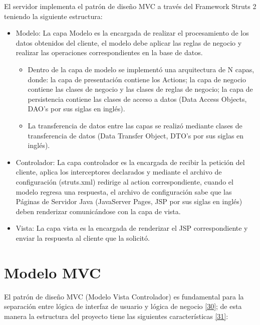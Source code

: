 El servidor implementa el patrón de diseño MVC a través del Framework Struts 2 teniendo la siguiente estructura:
\begin{itemize}
	\item Modelo: La capa Modelo es la encargada de realizar el procesamiento de los datos obtenidos del cliente, el modelo debe aplicar las reglas de negocio y realizar las operaciones correspondientes en la base de datos.
	
	\begin{itemize}
	
	\item Dentro de la capa de modelo se implementó una arquitectura de N capas, donde: la capa de presentación contiene los Actions; la capa de negocio contiene las clases de negocio y las clases de reglas de negocio; la capa de persistencia contiene las clases de acceso a datos (Data Access Objects, DAO’s por sus siglas en inglés).\\
	
	\item La transferencia de datos entre las capas se realizó mediante clases de transferencia de datos (Data Transfer Object,  DTO’s por sus siglas en inglés).
	
	\end{itemize}
	
	\item Controlador: La capa controlador es la encargada de recibir la petición del cliente, aplica los interceptores declarados y mediante el archivo de configuración (struts.xml) redirige al action correspondiente, cuando el modelo regresa una respuesta, el archivo de configuración sabe que las Páginas de Servidor Java (JavaServer Pages, JSP por sus siglas en inglés) deben renderizar comunicándose con la capa de vista.
	
	\item Vista: La capa vista es la encargada de renderizar el JSP correspondiente y enviar la respuesta al cliente que la solicitó.
\end{itemize}


\section{Modelo MVC}
El patrón de diseño MVC (Modelo Vista Controlador) es fundamental para la separación entre lógica de interfaz de usuario y lógica de negocio \hyperlink{b30}{[30]}; de esta manera la estructura del proyecto tiene las siguientes características \hyperlink{b31}{[31]}:


